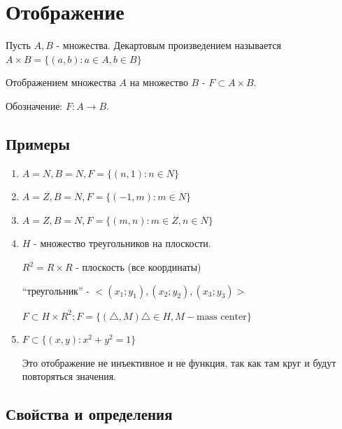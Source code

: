 \documentclass[letterpaper]{article}
\begin{document}
\section{Отображение}
\label{sec:org5b38f2a}
Пусть \(A, B\) - множества. Декартовым произведением называется
\(A \times B = \{(a, b): a \in A, b \in B\}\)

Отображением множества \(A\) на множество \(B\) - \(F \subset A \times B\).

Обозначение: \(F: A \rightarrow B\).
\subsection{Примеры}
\label{sec:org6716822}
\begin{enumerate}
\item \(A = N, B = N, F = \{(n, 1): n \in N\}\)
\item \(A = Z, B = N, F = \{(-1, m): m \in N\}\)
\item \(A = Z, B = N, F = \{(m, n): m \in Z, n \in N\}\)
\item \(H\) - множество треугольников на плоскости.

\(R^2 = R \times R\) - плоскость (все координаты)

``треугольник'' - \(<(x_1; y_1), (x_2; y_2), (x_3; y_3)>\)

\(F \subset H \times R^2; F = \{(\triangle, M) \triangle \in H, M - \text{mass center}\}\)
\item \(F \subset \{(x, y): x^2 + y^2 = 1\}\)

Это отображение не инъективное и не функция, так как там круг и будут повторяться значения.
\end{enumerate}
\subsection{Свойства и определения}
\label{sec:org14f432c}
\end{document}
